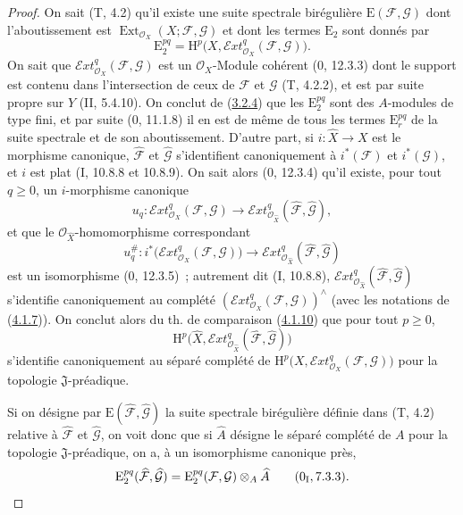 \begin{proof}
On sait (T, 4.2) qu'il existe une suite spectrale birégulière
$\mathrm E(\mathcal F,\mathcal G)$ dont l'aboutissement est
$\operatorname{Ext}_{\mathcal O_X}(X;\mathcal F,\mathcal G)$ et dont les termes
$\mathrm E_2$ sont donnés par
\[
\mathrm E_2^{pq}=\mathrm H^p\bigl(X,
\mathcal{E}\!xt^q_{\mathcal O_X}(\mathcal F,\mathcal G)\bigr).
\]
On sait que $\mathcal{E}\!xt^q_{\mathcal O_X}(\mathcal F,\mathcal G)$ est un
$\mathcal O_X$-Module cohérent (0, 12.3.3) dont le support est contenu dans
l'intersection de ceux de $\mathcal F$ et $\mathcal G$ (T, 4.2.2), et est
par suite propre sur $Y$ (II, 5.4.10). On conclut de
(\hyperref[III.3.2.4-fr]{3.2.4}) que les $\mathrm E_2^{pq}$ sont des
$A$-modules de type fini, et par suite (0, 11.1.8) il en est de même de tous
les termes $\mathrm E_r^{pq}$ de la suite spectrale et de son aboutissement.
D'autre part, si $i:\widehat X\to X$ est le morphisme canonique,
$\widehat{\mathcal F}$ et $\widehat{\mathcal G}$ s'identifient canoniquement
à $i^*(\mathcal F)$ et $i^*(\mathcal G)$, et $i$ est plat (I, 10.8.8 et
10.8.9). On sait alors (0, 12.3.4) qu'il existe, pour tout $q\geq0$, un
$i$-morphisme canonique
\[
u_q:\mathcal{E}\!xt^q_{\mathcal O_X}(\mathcal F,\mathcal G)
\longrightarrow
\mathcal{E}\!xt^q_{\mathcal O_{\widehat X}}
(\widehat{\mathcal F},\widehat{\mathcal G}),
\]
et que le $\mathcal O_{\widehat X}$-homomorphisme correspondant
\[
u_q^\#:i^*\bigl(\mathcal{E}\!xt^q_{\mathcal O_X}(\mathcal F,\mathcal G)\bigr)
\longrightarrow
\mathcal{E}\!xt^q_{\mathcal O_{\widehat X}}
(\widehat{\mathcal F},\widehat{\mathcal G})
\]
est un isomorphisme (0, 12.3.5)~; autrement dit (I, 10.8.8),
$\mathcal{E}\!xt^q_{\mathcal O_{\widehat X}}
(\widehat{\mathcal F},\widehat{\mathcal G})$ s'identifie canoniquement au
complété $(\mathcal{E}\!xt^q_{\mathcal O_X}(\mathcal F,\mathcal G))^\wedge$ (avec les
notations de (\hyperref[III.4.1.7-fr]{4.1.7})). On conclut alors du th. de
comparaison (\hyperref[III.4.1.10-fr]{4.1.10}) que pour tout $p\geq0$,
\[
\mathrm H^p\bigl(\widehat X,
\mathcal{E}\!xt^q_{\mathcal O_{\widehat X}}
(\widehat{\mathcal F},\widehat{\mathcal G})\bigr)
\]
s'identifie canoniquement au séparé complété de
$\mathrm H^p\bigl(X,\mathcal{E}\!xt^q_{\mathcal O_X}
(\mathcal F,\mathcal G)\bigr)$ pour la topologie $\mathfrak J$-préadique.


Si on désigne par $\mathrm E(\widehat{\mathcal F},
\widehat{\mathcal G})$ la suite spectrale birégulière définie dans (T, 4.2)
relative à $\widehat{\mathcal F}$ et $\widehat{\mathcal G}$, on voit donc que
si $\widehat A$ désigne le séparé complété de $A$ pour la topologie
$\mathfrak J$-préadique, on a, à un isomorphisme canonique près,
\[
\mathrm E_2^{pq}(\widehat{\mathcal F},\widehat{\mathcal G})
=\mathrm E_2^{pq}(\mathcal F,\mathcal G)\otimes_A\widehat A
\qquad (0\textsubscript{I}, 7.3.3).
\]


\end{proof}
